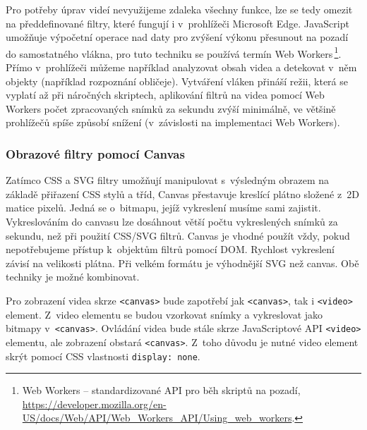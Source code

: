Pro potřeby úprav videí nevyužijeme zdaleka všechny funkce, lze se tedy omezit na předdefinované filtry, které fungují i v~prohlížeči Microsoft Edge. JavaScript umožňuje výpočetní operace nad daty pro zvýšení výkonu přesunout na pozadí do samostatného vlákna, pro tuto techniku se používá termín Web Workers\,\footnote{Web Workers -- standardizované API pro běh skriptů na pozadí, \url{https://developer.mozilla.org/en-US/docs/Web/API/Web_Workers_API/Using_web_workers}.}. Přímo v~prohlížeči můžeme například analyzovat obsah videa a detekovat v~něm objekty (například rozpoznání obličeje). Vytváření vláken přináší režii, která se vyplatí až při náročných skriptech, aplikování filtrů na videa pomocí Web Workers počet zpracovaných snímků za sekundu zvýší minimálně, ve většině prohlížečů spíše způsobí snížení (v~závislosti na implementaci Web Workers). 

\subsubsection{Obrazové filtry pomocí Canvas}
Zatímco CSS a SVG filtry umožňují manipulovat s~výsledným obrazem na základě přiřazení CSS stylů a tříd, Canvas přestavuje kreslící plátno složené z~2D matice pixelů. Jedná se o~bitmapu, jejíž vykreslení musíme sami zajistit. Vykreslováním do canvasu lze dosáhnout větší počtu vykreslených snímků za sekundu, než při použití CSS/SVG filtrů. Canvas je vhodné použít vždy, pokud nepotřebujeme přístup k~objektům filtrů pomocí DOM. Rychlost vykreslení závisí na velikosti plátna. Při velkém formátu je výhodnější SVG než canvas. Obě techniky je možné kombinovat.

Pro zobrazení videa skrze \texttt{<canvas>} bude zapotřebí jak \texttt{<canvas>}, tak i \texttt{<video>} element. Z~video elementu se budou vzorkovat snímky a vykreslovat jako bitmapy v~\texttt{<canvas>}. Ovládání videa bude stále skrze JavaScriptové API \texttt{<video>} elementu, ale zobrazení obstará \texttt{<canvas>}. Z~toho důvodu je nutné video element skrýt pomocí CSS vlastnosti \texttt{display: none}.

